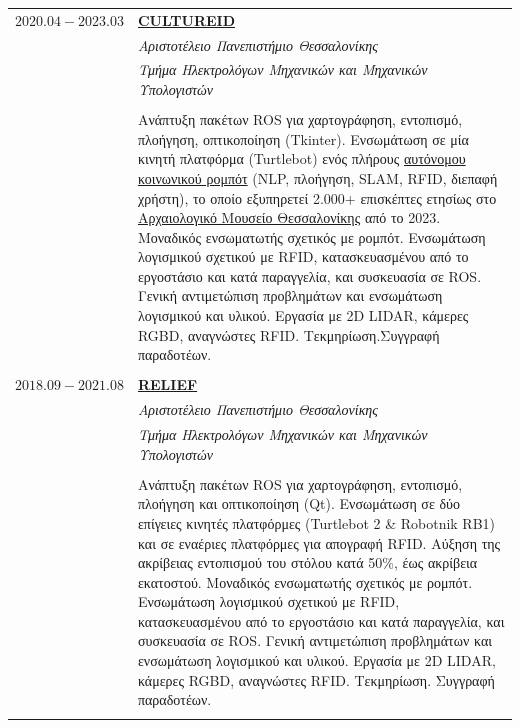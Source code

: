 \documentclass[a4paper,10pt,twoside]{article}
\begin{document}
\begin{tabular}{rp{11cm}}
$2020.04 - 2023.03$ & \href{https://cultureid.web.auth.gr/?page\_id=216\&lang=en}{\textbf{CULTUREID}} \\
                    & \textit{Αριστοτέλειο Πανεπιστήμιο Θεσσαλονίκης}\\
                    & \textit{Τμήμα Ηλεκτρολόγων Μηχανικών και Μηχανικών Υπολογιστών} \\
\\
                    & Ανάπτυξη πακέτων ROS για χαρτογράφηση, εντοπισμό, πλοήγηση, οπτικοποίηση (Tkinter). Ενσωμάτωση σε μία κινητή πλατφόρμα (Turtlebot) ενός πλήρους \href{https://www.youtube.com/watch?v=2EvTGNOqTrs}{αυτόνομου κοινωνικού ρομπότ} (NLP, πλοήγηση, SLAM, RFID, διεπαφή χρήστη), το οποίο εξυπηρετεί 2.000+ επισκέπτες ετησίως στο \href{https://www.amth.gr/}{Αρχαιολογικό Μουσείο Θεσσαλονίκης} από το 2023. Μοναδικός ενσωματωτής σχετικός με ρομπότ. Ενσωμάτωση λογισμικού σχετικού με RFID, κατασκευασμένου από το εργοστάσιο και κατά παραγγελία, και συσκευασία σε ROS. Γενική αντιμετώπιση προβλημάτων και ενσωμάτωση λογισμικού και υλικού. Εργασία με 2D LIDAR, κάμερες RGBD, αναγνώστες RFID. Τεκμηρίωση.Συγγραφή παραδοτέων. \\
&\\
$2018.09 - 2021.08$ & \href{https://relief.web.auth.gr/}{\textbf{RELIEF}} \\
                    & \textit{Αριστοτέλειο Πανεπιστήμιο Θεσσαλονίκης}\\
                    & \textit{Τμήμα Ηλεκτρολόγων Μηχανικών και Μηχανικών Υπολογιστών} \\
\\
                    & Ανάπτυξη πακέτων ROS για χαρτογράφηση, εντοπισμό, πλοήγηση και οπτικοποίηση (Qt). Ενσωμάτωση σε δύο επίγειες κινητές πλατφόρμες (Turtlebot 2 \& Robotnik RB1) και σε εναέριες πλατφόρμες για απογραφή RFID. Αύξηση της ακρίβειας εντοπισμού του στόλου κατά 50\%, έως ακρίβεια εκατοστού. Μοναδικός ενσωματωτής σχετικός με ρομπότ. Ενσωμάτωση λογισμικού σχετικού με RFID, κατασκευασμένου από το εργοστάσιο και κατά παραγγελία, και συσκευασία σε ROS. Γενική αντιμετώπιση προβλημάτων και ενσωμάτωση λογισμικού και υλικού. Εργασία με 2D LIDAR, κάμερες RGBD, αναγνώστες RFID. Τεκμηρίωση. Συγγραφή παραδοτέων. \\
&\\
\end{tabular}

\end{document}
